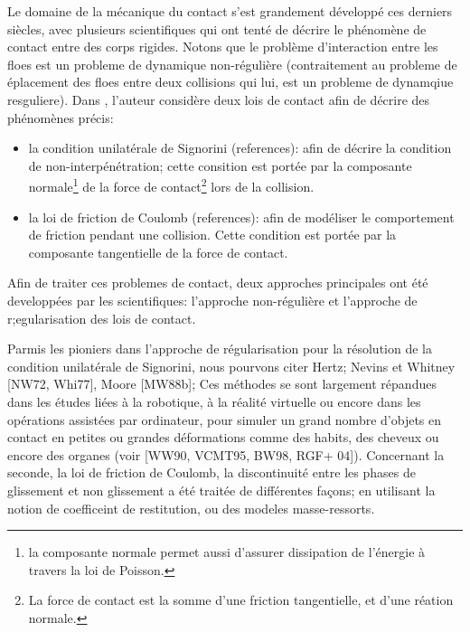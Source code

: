 Le domaine de la mécanique du contact s'est grandement développé ces derniers siècles, avec plusieurs scientifiques qui ont tenté de décrire le phénomène de contact entre des corps rigides. Notons que le problème d'interaction entre les floes est un probleme de dynamique non-régulière (contraitement au probleme de éplacement des floes entre deux collisions qui lui, est un probleme de dynamqiue resguliere). Dans \parencite{rabatel2015thesis}, l'auteur considère deux lois de contact afin de décrire des phénomènes précis:
\begin{itemize}
    \item la condition unilatérale de Signorini (references): afin de décrire la condition de non-interpénétration; cette consition est portée par la composante normale\footnote{la composante normale permet aussi d'assurer dissipation de l'énergie à travers la loi de Poisson.} de la force de contact\footnote{La force de contact est la somme d'une friction tangentielle, et d'une réation normale.} lors de la collision.
    \item la loi de friction de Coulomb (references): afin de modéliser le comportement de friction pendant une collision. Cette condition est portée par la composante tangentielle de la force de contact.
\end{itemize}

\noindent Afin de traiter ces problemes de contact, deux approches principales ont été developpées par les scientifiques: l'approche non-régulière et l'approche de r;egularisation des lois de contact. 

Parmis les pioniers dans l'approche de régularisation pour la résolution de la condition unilatérale de Signorini, nous pourvons citer Hertz; Nevins et Whitney [NW72, Whi77], Moore [MW88b]; Ces méthodes se sont largement répandues dans les études liées à la robotique, à la réalité virtuelle ou encore dans les opérations assistées par ordinateur, pour simuler un grand nombre d’objets en contact en petites ou grandes déformations comme des habits, des cheveux ou encore des organes (voir [WW90, VCMT95, BW98, RGF+ 04]). Concernant la seconde, la loi de friction de Coulomb, la discontinuité entre les phases de glissement et non glissement a été traitée de différentes façons; en utilisant la notion de coefficeint de restitution, ou des modeles masse-ressorts. 
 
